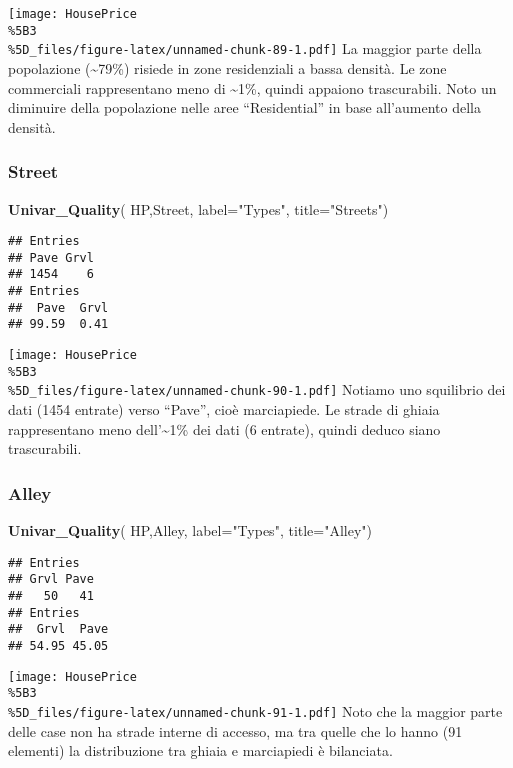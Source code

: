 \documentclass[
]{article}
\newenvironment{Shaded}{\begin{snugshade}}{\end{snugshade}}
\newcommand{\AttributeTok}[1]{\textcolor[rgb]{0.13,0.29,0.53}{#1}}
\newcommand{\FunctionTok}[1]{\textcolor[rgb]{0.13,0.29,0.53}{\textbf{#1}}}
\newcommand{\NormalTok}[1]{#1}
\newcommand{\StringTok}[1]{\textcolor[rgb]{0.31,0.60,0.02}{#1}}
\begin{document}
\texttt{[image: HousePrice\\\%5B3\\\%5D\_files/figure-latex/unnamed-chunk-89-1.pdf]}
La maggior parte della popolazione (\textasciitilde79\%) risiede in zone
residenziali a bassa densità. Le zone commerciali rappresentano meno di
\textasciitilde1\%, quindi appaiono trascurabili. Noto un diminuire
della popolazione nelle aree ``Residential'' in base all'aumento della
densità.

\subsubsection{Street}\label{street}

\begin{Shaded}
\begin{Highlighting}[]
\FunctionTok{Univar\_Quality}\NormalTok{(}
\NormalTok{  HP,Street,}
  \AttributeTok{label=}\StringTok{"Types"}\NormalTok{,}
  \AttributeTok{title=}\StringTok{"Streets"}\NormalTok{)}
\end{Highlighting}
\end{Shaded}

\begin{verbatim}
## Entries
## Pave Grvl 
## 1454    6 
## Entries
##  Pave  Grvl 
## 99.59  0.41
\end{verbatim}

\texttt{[image: HousePrice\\\%5B3\\\%5D\_files/figure-latex/unnamed-chunk-90-1.pdf]}
Notiamo uno squilibrio dei dati (1454 entrate) verso ``Pave'', cioè
marciapiede. Le strade di ghiaia rappresentano meno
dell'\textasciitilde1\% dei dati (6 entrate), quindi deduco siano
trascurabili.

\subsubsection{Alley}\label{alley}

\begin{Shaded}
\begin{Highlighting}[]
\FunctionTok{Univar\_Quality}\NormalTok{(}
\NormalTok{  HP,Alley,}
  \AttributeTok{label=}\StringTok{"Types"}\NormalTok{,}
  \AttributeTok{title=}\StringTok{"Alley"}\NormalTok{)}
\end{Highlighting}
\end{Shaded}

\begin{verbatim}
## Entries
## Grvl Pave 
##   50   41 
## Entries
##  Grvl  Pave 
## 54.95 45.05
\end{verbatim}

\texttt{[image: HousePrice\\\%5B3\\\%5D\_files/figure-latex/unnamed-chunk-91-1.pdf]}
Noto che la maggior parte delle case non ha strade interne di accesso,
ma tra quelle che lo hanno (91 elementi) la distribuzione tra ghiaia e
marciapiedi è bilanciata.
\end{document}
